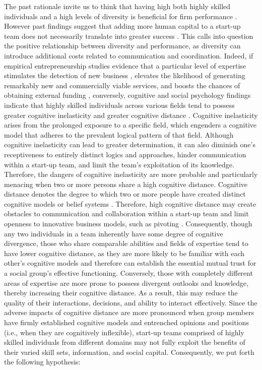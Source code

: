 \documentclass[12pt]{article}
\begin{document}
The past rationale invite us to think that having high both highly skilled individuals and a high levels of diversity is beneficial for firm performance \citep{diaz2020top}. However past findings suggest that adding more human capital to a start-up team does not necessarily translate into greater success \citep{pierce2013too, sundermeier2022entrepreneurial}. This calls into question the positive relationship between diversity and performance, as diversity can introduce additional costs related to communication and coordination. Indeed, if empirical entrepreneurship studies evidence that a particular level of expertise stimulates the detection of new business \citep{shane2000promise, marvel2016human}, elevates the likelihood of generating remarkably new and commercially viable services, and boosts the chances of obtaining external funding \citep{beckman2007early, marvel2007technology}, conversely, cognitive and social psychology findings indicate that highly skilled individuals across various fields tend to possess greater cognitive inelasticity and greater cognitive distance \citep{nooteboom2007optimal}. Cognitive inelasticity arises from the prolonged exposure to a specific field, which engenders a cognitive model that adheres to the prevalent logical pattern of that field. Although cognitive inelasticity can lead to greater determination, it can also diminish one's receptiveness to entirely distinct logics and approaches, hinder communication within a start-up team, and limit the team's exploitation of its knowledge. Therefore, the dangers of cognitive inelasticity are more probable and particularly menacing when two or more persons share a high cognitive distance. Cognitive distance denotes the degree to which two or more people have created distinct cognitive models or belief systems \citep{nooteboom2007optimal}. Therefore, high cognitive distance may create obstacles to communication and collaboration within a start-up team and limit openness to innovative business models, such as pivoting \citep{kirtley2020pivot}. Consequently, though any two individuals in a team inherently have some degree of cognitive divergence, those who share comparable abilities and fields of expertise tend to have lower cognitive distance, as they are more likely to be familiar with each other's cognitive models and therefore can establish the essential mutual trust for a social group's effective functioning. Conversely, those with completely different areas of expertise are more prone to possess divergent outlooks and knowledge, thereby increasing their cognitive distance. As a result, this may reduce the quality of their interactions, decisions, and ability to interact effectively. Since the adverse impacts of cognitive distance are more pronounced when group members have firmly established cognitive models and entrenched opinions and positions (i.e., when they are cognitively inflexible), start-up teams comprised of highly skilled individuals from different domains may not fully exploit the benefits of their varied skill sets, information, and social capital. Consequently, we put forth the following hypothesis: \\
\end{document}
